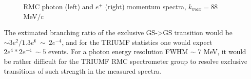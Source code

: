 \documentclass[12pt]{article}
\begin{document}
\begin{figure}
  \caption {
    \label{fig:rmc_photon_and_positron_spectra}
    RMC photon (left) and $e^+$ (right) momentum spectra, $k_{max} = 88$ MeV/c
  }
\end{figure}

The extimated branching ratio of the exclusive GS->GS transition would be 
$\sim 3e^2/1.3e^6 ~ \sim ~ 2e^{-4}$, and for the TRIUMF statistics one would expect
$2e^4*2e^{-4} ~\sim 5$ events. For a photon energy resolution FWHM $\sim$ 7 MeV,
it would be rather difficult for the TRIUMF RMC spectrometer group to resolve exclusive
transitions of such strength in the measured spectra. 
\end{document}
